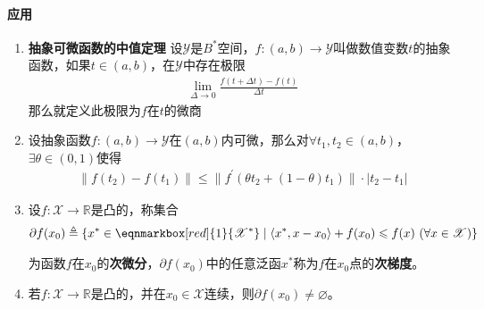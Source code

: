 	\paragraph{应用}
	\begin{enumerate}[leftmargin=2cm, label=\arabic*]
		\item \textbf{抽象可微函数的中值定理} 设$\mathscr{Y}$是$B^*$空间，$f:(a,b)\to\mathscr{Y}$叫做数值变数$t$的抽象函数，如果$t\in(a,b)$，在$\mathscr{Y}$中存在极限
		\begin{align*}
			\lim\limits_{\Delta\to 0} \frac{f(t+\Delta t) - f(t)}{\Delta t}   
		\end{align*}
		那么就定义此极限为$f$在$t$的微商
		\item 设抽象函数$f:(a,b)\to \mathscr{Y}$在$(a,b)$内可微，那么对$\forall t_1, t_2\in(a,b)$，$\exists \theta\in(0,1)$使得
		\begin{align*}
			\|f(t_2) - f(t_1)\| \leqslant \|f^{\prime}(\theta t_2 + (1-\theta)t_1)\| \cdot |t_2-t_1|
		\end{align*}
		
		\item 设$f:\mathscr{X}\to\mathbb{R}$是凸的，称集合
		\begin{align*}
			\partial f(x_0) \triangleq \{x^*\in\eqnmarkbox[red]{1}{\mathscr{X}^*}\mid \langle x^*, x-x_0\rangle + f(x_0) \leqslant f(x)\ (\forall x\in\mathscr{X}) \}
		\end{align*}
		
		为函数$f$在$x_0$的\textbf{次微分}，$\partial f(x_0)$中的任意泛函$x^*$称为$f$在$x_0$点的\textbf{次梯度}。
		
		\item 若$f:\mathscr{X}\to\mathbb{R}$是凸的，并在$x_0\in\mathscr{X}$连续，则$\partial f(x_0)\neq\varnothing$。
		
	\end{enumerate}
	
	
